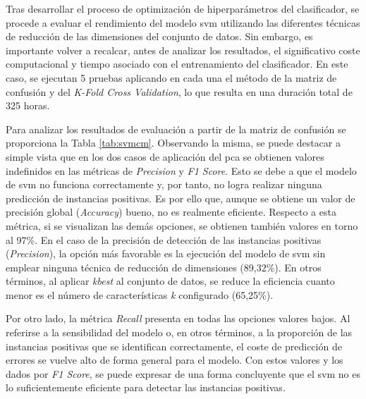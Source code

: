 Tras desarrollar el proceso de optimización de hiperparámetros del clasificador, se procede a evaluar el rendimiento del modelo \gls{svm} utilizando las diferentes técnicas de reducción de las dimensiones del conjunto de datos. Sin embargo, es importante volver a recalcar, antes de analizar los resultados, el significativo coste computacional y tiempo asociado con el entrenamiento del clasificador. En este caso, se ejecutan 5 pruebas aplicando en cada una el método de la matriz de confusión y del \textit{K-Fold Cross Validation}, lo que resulta en una duración total de 325 horas.

\vspace{3mm}

Para analizar los resultados de evaluación a partir de la matriz de confusión se proporciona la Tabla \ref{tab:svmcm}. Observando la misma, se puede destacar a simple vista que en los dos casos de aplicación del \gls{pca} se obtienen valores indefinidos en las métricas de \textit{Precision} y \textit{F1 Score}. Esto se debe a que el modelo de \gls{svm} no funciona correctamente y, por tanto, no logra realizar ninguna predicción de instancias positivas. Es por ello que, aunque se obtiene un valor de precisión global (\textit{Accuracy}) bueno, no es realmente eficiente. Respecto a esta métrica, si se visualizan las demás opciones, se obtienen también valores en torno al 97\%. En el caso de la precisión de detección de las instancias positivas (\textit{Precision}), la opción más favorable es la ejecución del modelo de \gls{svm} sin emplear ninguna técnica de reducción de dimensiones (89,32\%). En otros términos, al aplicar \textit{kbest} al conjunto de datos, se reduce la eficiencia cuanto menor es el número de características \textit{k} configurado (65,25\%).

\vspace{3mm}

Por otro lado, la métrica \textit{Recall} presenta en todas las opciones valores  bajos. Al referirse a la sensibilidad del modelo o, en otros términos, a la proporción de las instancias positivas que se identifican correctamente, el coste de predicción de errores se vuelve alto de forma general para el modelo. Con estos valores y los dados por \textit{F1 Score}, se puede expresar de una forma concluyente que el \gls{svm} no es lo suficientemente eficiente para detectar las instancias positivas. 

\vspace{3mm}

